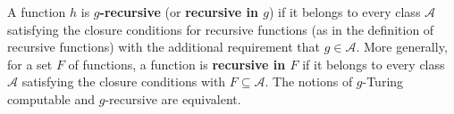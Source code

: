 A function $h$ is \textbf{$g$-recursive} (or \textbf{recursive in $g$}) if it belongs to every class $\mathcal{A}$ satisfying the closure conditions for recursive functions (as in the definition of recursive functions) with the additional requirement that $g \in \mathcal{A}$. More generally, for a set $F$ of functions, a function is \textbf{recursive in $F$} if it belongs to every class $\mathcal{A}$ satisfying the closure conditions with $F \subseteq \mathcal{A}$. The notions of $g$-Turing computable and $g$-recursive are equivalent.

